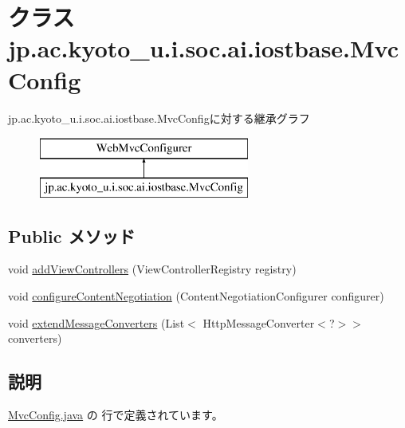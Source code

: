 \hypertarget{classjp_1_1ac_1_1kyoto__u_1_1i_1_1soc_1_1ai_1_1iostbase_1_1_mvc_config}{\section{クラス jp.\-ac.\-kyoto\-\_\-u.\-i.\-soc.\-ai.\-iostbase.\-Mvc\-Config}
\label{classjp_1_1ac_1_1kyoto__u_1_1i_1_1soc_1_1ai_1_1iostbase_1_1_mvc_config}
}
jp.\-ac.\-kyoto\-\_\-u.\-i.\-soc.\-ai.\-iostbase.\-Mvc\-Configに対する継承グラフ\begin{figure}[H]
\begin{center}
\leavevmode
\includegraphics[height=2.000000cm]{classjp_1_1ac_1_1kyoto__u_1_1i_1_1soc_1_1ai_1_1iostbase_1_1_mvc_config}
\end{center}
\end{figure}
\subsection*{Public メソッド}
\begin{DoxyCompactItemize}
\item 
void \hyperlink{classjp_1_1ac_1_1kyoto__u_1_1i_1_1soc_1_1ai_1_1iostbase_1_1_mvc_config_a4bf26f64510d0be575861423e815026e}{add\-View\-Controllers} (View\-Controller\-Registry registry)
\item 
void \hyperlink{classjp_1_1ac_1_1kyoto__u_1_1i_1_1soc_1_1ai_1_1iostbase_1_1_mvc_config_a4f59ec97341809f0c204c30910157283}{configure\-Content\-Negotiation} (Content\-Negotiation\-Configurer configurer)
\item 
void \hyperlink{classjp_1_1ac_1_1kyoto__u_1_1i_1_1soc_1_1ai_1_1iostbase_1_1_mvc_config_a3443a38580a15bbc511338ab65ed6c1d}{extend\-Message\-Converters} (List$<$ Http\-Message\-Converter$<$?$>$$>$ converters)
\end{DoxyCompactItemize}


\subsection{説明}


 \hyperlink{_mvc_config_8java_source}{Mvc\-Config.\-java} の  行で定義されています。



